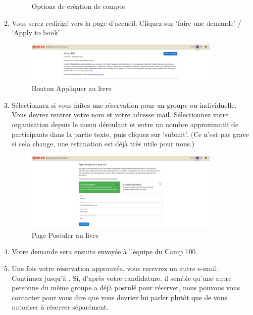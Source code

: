 \documentclass[a4paper, 11pt]{report}
\begin{document}
\begin{enumerate}
\begin{figure}[H]
        \caption{Options de cr\'eation de compte}
    \end{figure}
    \item Vous serez redirig\'e vers la page d'accueil. Cliquez sur `faire une demande' / `Apply to book'
    \begin{figure}[H]
        \centering
        \includegraphics[width=0.9\textwidth]{assets/1-homepage-loggedin.png}
        \caption{Bouton Appliquer au livre}
    \end{figure}
    \item S\'electionnez si vous faites une r\'eservation pour un groupe ou individuelle. Vous devrez rentrer votre nom et votre adresse mail. S\'electionnez votre organisation depuis le menu d\'eroulant et entre un nombre approximatif de participants dans la partie texte, puis cliquez sur `submit'. (Ce n'est pas grave si cela change, une estimation est d\'ej\`a tr\`es utile pour nous.)
    \begin{figure}[H]
        \centering
        \includegraphics[width=0.9\textwidth]{assets/1-apply.png}
        \caption{Page Postuler au livre}
    \end{figure}
    \item Votre demande sera ensuite envoy\'ee \`a l'\'equipe du Camp 100.
    \item Une fois votre r\'eservation approuv\'ee, vous recevrez un autre e-mail. Continuez jusqu'\`a . Si, d'apr\`es votre candidature, il semble qu'une autre personne du m\^eme groupe a d\'ej\`a postul\'e pour r\'eserver, nous pouvons vous contacter pour vous dire que vous devriez lui parler plutôt que de vous autoriser \`a r\'eserver s\'epar\'ement.
\end{enumerate}
\end{document}
